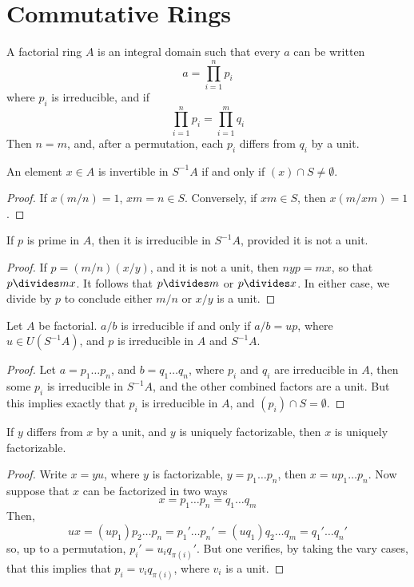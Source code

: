 \chapter{Commutative Rings}

\begin{definition}
    A factorial ring $A$ is an integral domain such that every $a$ can be written
    \[ a = \prod_{i = 1}^n p_i \]
    where $p_i$ is irreducible, and if
    \[ \prod_{i = 1}^n p_i = \prod_{i = 1}^m q_i \]
    Then $n = m$, and, after a permutation, each $p_i$ differs from $q_i$ by a unit.
\end{definition}

\begin{lemma}
    An element $x \in A$ is invertible in $S^{-1}A$ if and only if $(x) \cap S \neq \emptyset$.
\end{lemma}
\begin{proof}
    If $x (m/n) = 1$, $xm = n \in S$. Conversely, if $xm \in S$, then $x (m/xm) = 1$.
\end{proof}

\begin{lemma}
    If $p$ is prime in $A$, then it is irreducible in $S^{-1}A$, provided it is not a unit.
\end{lemma}
\begin{proof}
    If $p = (m/n)(x/y)$, and it is not a unit, then $nyp = mx$, so that $p \divides mx$. It follows that $p \divides m$ or $p \divides x$. In either case, we divide by $p$ to conclude either $m/n$ or $x/y$ is a unit.
\end{proof}

\begin{lemma}
    Let $A$ be factorial. $a/b$ is irreducible if and only if $a/b = up$, where $u \in U(S^{-1}A)$, and $p$ is irreducible in $A$ and $S^{-1}A$.
\end{lemma}
\begin{proof}
     Let $a = p_1 \dots p_n$, and $b = q_1 \dots q_n$, where $p_i$ and $q_i$ are irreducible in $A$, then some $p_i$ is irreducible in $S^{-1}A$, and the other combined factors are a unit. But this implies exactly that $p_i$ is irreducible in $A$, and $(p_i) \cap S = \emptyset$.
\end{proof}

\begin{lemma}
    If $y$ differs from $x$ by a unit, and $y$ is uniquely factorizable, then $x$ is uniquely factorizable.
\end{lemma}
\begin{proof}
    Write $x = yu$, where $y$ is factorizable, $y = p_1 \dots p_n$, then $x = u p_1 \dots p_n$. Now suppose that $x$ can be factorized in two ways
    \[ x = p_1 \dots p_n = q_1 \dots q_m \]
    Then,
    \[ ux = (up_1) p_2 \dots p_n = p_1' \dots p_n' = (uq_1) q_2 \dots q_m = q_1' \dots q_n' \]
    so, up to a permutation, $p_i' = u_i q_{\pi(i)}'$. But one verifies, by taking the vary cases, that this implies that $p_i = v_i q_{\pi(i)}$, where $v_i$ is a unit.
\end{proof}

